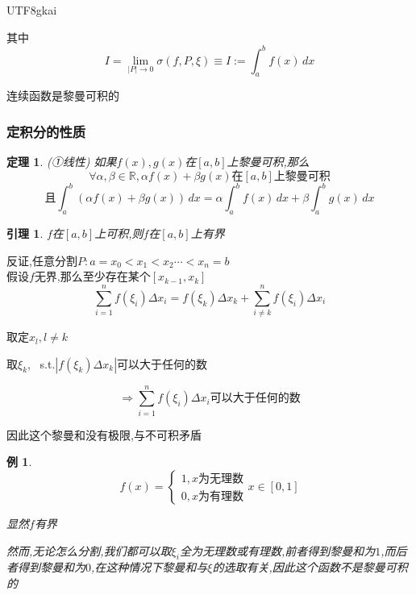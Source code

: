\documentclass{article}
\newtheorem{theorem}{定理}[subsection]
\newtheorem{lemma}{引理}[subsection]
\newtheorem{example}{例}[subsection]
\newenvironment{cproof}{%
\heiti{证明}\kaishu
}{%
}
\newenvironment{identification}{%
\heiti{定义}\kaishu
}{%
}
\newcommand{\RR}{\mathbb{R}}
\begin{document}
\begin{CJK}{UTF8}{gkai}
\begin{identification}
  其中
  \[I = \lim_{|P|\to 0} \sigma(f,P,\xi) \equiv I := \int_{a}^{b}f(x)\,dx\]
\end{identification}

连续函数是黎曼可积的\\

\subsubsection{定积分的性质}

\begin{theorem}(①线性)
如果$f(x),g(x)$在$[a,b]$上黎曼可积,那么
\[\forall \alpha,\beta\in \RR , \alpha f(x) + \beta g(x)\text{在}[a,b]\text{上黎曼可积}\]
\[\text{且} \int_{a}^{b} (\alpha f(x) + \beta g(x))\,dx = \alpha \int_{a}^{b}f(x)\,dx + \beta \int_{a}^{b}g(x)\,dx\]
\end{theorem}

\begin{lemma}
  $f$在$[a,b]$上可积,则$f$在$[a,b]$上有界\\
\end{lemma}

\begin{cproof}
  反证,任意分割$P: a = x_0< x_1 <x_2\cdots < x_n = b$\\
  假设$f$无界,那么至少存在某个$[x_{k-1},x_k]$
  \[\sum_{i = 1}^n f(\xi_i)\Delta x_i  = f(\xi_k)\Delta x_k+\sum_{i \neq k}^n f(\xi_i)\Delta x_i \]

  取定$x_l,l\neq k$

  取$\xi_k$,~ s.t.$| f(\xi_k)\Delta x_k|$可以大于任何的数

  \[\Rightarrow \sum_{i = 1}^n f(\xi_i)\Delta x_i\text{可以大于任何的数}\]

  因此这个黎曼和没有极限,与不可积矛盾
\end{cproof}

\begin{example}
  \begin{equation*}
    f(x)=
    \begin{cases}
      1,x\text{为无理数}\\
      0,x\text{为有理数}
    \end{cases}
    x\in[0,1]
  \end{equation*}

显然$f$有界

然而,无论怎么分割,我们都可以取$\xi_i$全为无理数或有理数,前者得到黎曼和为$1$,而后者得到黎曼和为$0$,在这种情况下黎曼和与$\xi$的选取有关,因此这个函数不是黎曼可积的\\
\end{example}


\end{CJK}
\end{document}
